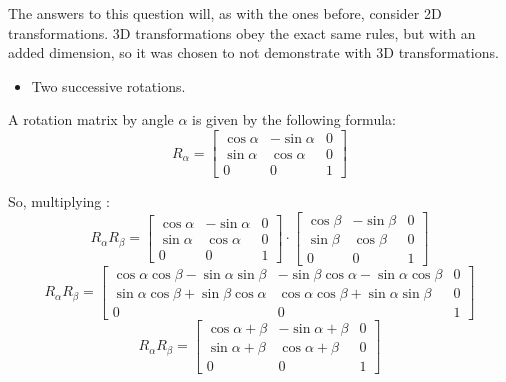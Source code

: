 \documentclass[12pt]{article}
\begin{document}
The answers to this question will, as with the ones before, consider 2D transformations. 3D transformations obey the exact same rules, but with an added dimension, so it was chosen to not demonstrate with 3D transformations.

\begin{itemize}
    \item Two successive rotations.
\end{itemize}

A rotation matrix by angle $\alpha$ is given by the following formula:
\begin{equation*}
    R_\alpha=
    \begin{bmatrix}
    \cos{\alpha} & -\sin{\alpha} & 0 \\
    \sin{\alpha} & \cos{\alpha} & 0 \\
    0 & 0 & 1
    \end{bmatrix}
\end{equation*}

So, multiplying :
\begin{equation*}
    R_\alpha R_\beta=
    \begin{bmatrix}
    \cos{\alpha} & -\sin{\alpha} & 0 \\
    \sin{\alpha} & \cos{\alpha} & 0 \\
    0 & 0 & 1
    \end{bmatrix}
    \cdot
    \begin{bmatrix}
    \cos{\beta} & -\sin{\beta} & 0 \\
    \sin{\beta} & \cos{\beta} & 0 \\
    0 & 0 & 1
    \end{bmatrix}
\end{equation*}
\begin{equation*}
    R_\alpha R_\beta=
    \begin{bmatrix}
    \cos{\alpha} \cos{\beta} - \sin{\alpha} \sin{\beta} & -\sin{\beta} \cos{\alpha} - \sin{\alpha} \cos{\beta} & 0 \\
    \sin{\alpha} \cos{\beta} + \sin{\beta} \cos{\alpha} & \cos{\alpha} \cos{\beta} + \sin{\alpha} \sin{\beta} & 0 \\
    0 & 0 & 1
    \end{bmatrix}
\end{equation*}
\begin{equation*}
    R_\alpha R_\beta= 
    \begin{bmatrix}
    \cos{\alpha+\beta} & -\sin{\alpha+\beta} & 0 \\
    \sin{\alpha+\beta} & \cos{\alpha+\beta} & 0 \\
    0 & 0 & 1
    \end{bmatrix}
\end{equation*}
\end{document}

